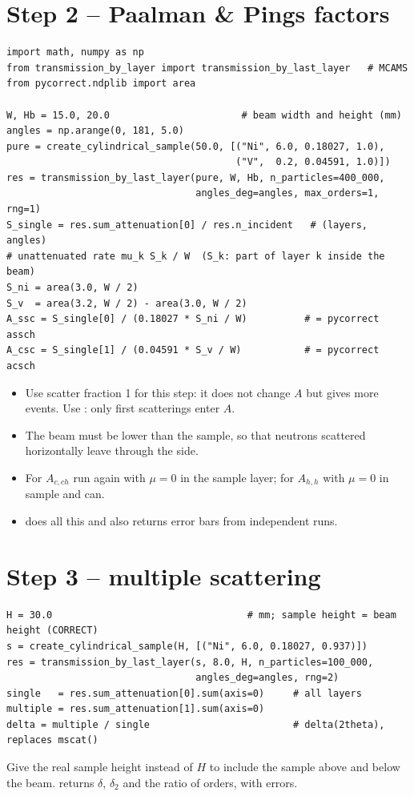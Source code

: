 \documentclass[11pt,a4paper]{report}
\begin{document}
\section{Step 2 -- Paalman \& Pings factors}

\begin{lstlisting}
import math, numpy as np
from transmission_by_layer import transmission_by_last_layer   # MCAMS
from pycorrect.ndplib import area

W, Hb = 15.0, 20.0                       # beam width and height (mm)
angles = np.arange(0, 181, 5.0)
pure = create_cylindrical_sample(50.0, [("Ni", 6.0, 0.18027, 1.0),
                                        ("V",  0.2, 0.04591, 1.0)])
res = transmission_by_last_layer(pure, W, Hb, n_particles=400_000,
                                 angles_deg=angles, max_orders=1, rng=1)
S_single = res.sum_attenuation[0] / res.n_incident   # (layers, angles)
# unattenuated rate mu_k S_k / W  (S_k: part of layer k inside the beam)
S_ni = area(3.0, W / 2)
S_v  = area(3.2, W / 2) - area(3.0, W / 2)
A_ssc = S_single[0] / (0.18027 * S_ni / W)          # = pycorrect assch
A_csc = S_single[1] / (0.04591 * S_v / W)           # = pycorrect acsch
\end{lstlisting}

\begin{itemize}
  \item Use scatter fraction 1 for this step: it does not change $A$ but gives
        more events. Use : only first scatterings enter $A$.
  \item The beam must be lower than the sample, so that neutrons scattered
        horizontally leave through the side.
  \item For $A_{c,ch}$ run again with $\mu=0$ in the sample layer; for $A_{h,h}$
        with $\mu=0$ in sample and can.
  \item {} does all
        this and also returns error bars from independent runs.
\end{itemize}

\section{Step 3 -- multiple scattering}

\begin{lstlisting}
H = 30.0                                  # mm; sample height = beam height (CORRECT)
s = create_cylindrical_sample(H, [("Ni", 6.0, 0.18027, 0.937)])
res = transmission_by_last_layer(s, 8.0, H, n_particles=100_000,
                                 angles_deg=angles, rng=2)
single   = res.sum_attenuation[0].sum(axis=0)     # all layers
multiple = res.sum_attenuation[1].sum(axis=0)
delta = multiple / single                         # delta(2theta), replaces mscat()
\end{lstlisting}
Give the real sample height instead of $H$ to include the sample above and below
the beam.  returns $\delta$, $\delta_2$ and the ratio of
orders, with errors.
\end{document}
